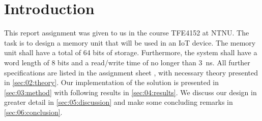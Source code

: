 \section{Introduction}
This report assignment was given to us in the course TFE4152 at NTNU. The task is to design a memory unit that will be used in an IoT device. The memory unit shall have a total of 64 bits of storage. Furthermore, the system shall have a word length of 8 bits and a read/write time of no longer than \SI{3}{ns}. All further specifications are listed in the assignment sheet \cite{oppgavebeskrivelse}, with necessary theory presented in \autoref{sec:02:theory}. Our implementation of the solution is presented in \autoref{sec:03:method} with following results in \autoref{sec:04:results}. We discuss our design in greater detail in \autoref{sec:05:discussion} and make some concluding remarks in \autoref{sec:06:conclusion}.